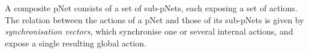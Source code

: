 \documentclass[smallcondensed]{svjour3}
\newcommand{\noteSB}[2][color=green!40, size=\tiny]{\todo[#1]{{\bf
      Note: } {#2}}}
\newcommand{\noteEM}[2][color=blue!40, size=\tiny]{\todo[#1]{{\bf Eric: } {#2}}}
\def\AlgA{\mathcal{A}}
\begin{document}
A composite pNet consists of a set of sub-pNets, each exposing
a set of actions. %
The relation between the actions of a pNet and those of its sub-pNets
is given by  \emph{synchronisation vectors}, which %
synchronise one or several internal actions, and
expose a single resulting global action.





\end{document}
